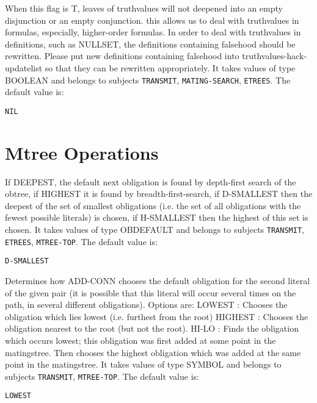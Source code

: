 \begin{description}
\item[TRUTHVALUES-HACK]  
When this flag is T, leaves of truthvalues will not deepened into
an empty disjunction or an empty conjunction. this allows us to deal with 
truthvalues in formulas, especially, higher-order formulas. In order to deal 
with truthvalues in definitions, such as NULLSET, the definitions containing 
falsehood should be rewritten. Please put new definitions containing falsehood
into truthvalues-hack-updatelist so that they can be rewritten appropriately.
It takes values of type BOOLEAN and belongs to subjects \texttt{TRANSMIT}, \texttt{MATING-SEARCH}, \texttt{ETREES}.  The default value is: \begin{lstlisting}
NIL
\end{lstlisting}

\item
\end{description}

\section{Mtree Operations}

\begin{description} 
\item[DEFAULT-OB]  
If DEEPEST, the default next obligation is found by depth-first
search of the obtree, if HIGHEST it is found by breadth-first-search, 
if D-SMALLEST then the deepest of the set of smallest obligations (i.e.
the set of all obligations with the fewest possible literals) is 
chosen, if H-SMALLEST then the highest of this set is chosen.
It takes values of type OBDEFAULT and belongs to subjects \texttt{TRANSMIT}, \texttt{ETREES}, \texttt{MTREE-TOP}.  The default value is: \begin{lstlisting}
D-SMALLEST
\end{lstlisting}

\item[MT-DEFAULT-OB-MATE]  
Determines how ADD-CONN chooses the default obligation for
the second literal of the given pair (it is possible that this literal
will occur several times on the path, in several different obligations).
Options are:
LOWEST : Chooses the obligation which lies lowest (i.e. furthest from the
root)
HIGHEST : Chooses the obligation nearest to the root (but not the root).
HI-LO : Finds the obligation which occurs lowest; this obligation was 
first added at some point in the matingstree. Then chooses the highest 
obligation which was added at the same point in the matingstree.
It takes values of type SYMBOL and belongs to subjects \texttt{TRANSMIT}, \texttt{MTREE-TOP}.  The default value is: \begin{lstlisting}
LOWEST
\end{lstlisting}

\item
\end{description}

